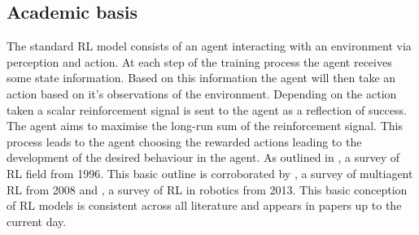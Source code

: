 \documentclass[10pt,journal]{IEEEtran}
\begin{document}
\subsection{Academic basis}
The standard RL model consists of an agent interacting with an environment via perception and action. At each step of the training process the agent receives some state information. Based on this information the agent will then take an action based on it's observations of the environment. Depending on the action taken a scalar reinforcement signal is sent to the agent as a reflection of success. The agent aims to maximise the long-run sum of the reinforcement signal. This process leads to the agent choosing the rewarded actions leading to the development of the desired behaviour in the agent. As outlined in \cite{Kaelbling}, a survey of RL field from 1996. This basic outline is corroborated by \cite{Busoniu}, a survey of multiagent RL from 2008 and \cite{Kober}, a survey of RL in robotics from 2013. This basic conception of RL models is consistent across all literature and appears in papers up to the current day.
\end{document}
